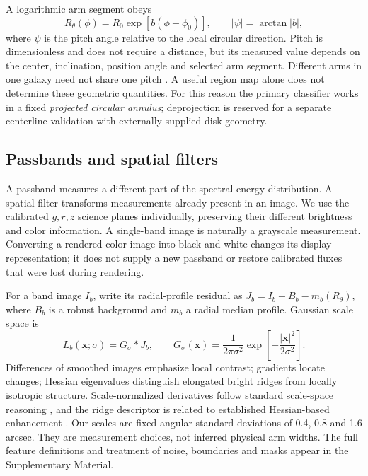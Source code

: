 \documentclass[11pt]{article}
\begin{document}
A logarithmic arm segment obeys
\begin{equation}
 R_\theta(\phi)=R_0\exp[b(\phi-\phi_0)],\qquad
 |\psi|=\arctan |b|,
 \label{eq:pitch}
\end{equation}
where $\psi$ is the pitch angle relative to the local circular direction.
Pitch is dimensionless and does not require a distance, but its measured value
depends on the center, inclination, position angle and selected arm segment.
Different arms in one galaxy need not share one pitch
\citep{davis2014,lingard2021}. A useful region map alone does not determine these
geometric quantities. For this reason the primary classifier works in a fixed
\emph{projected circular annulus}; deprojection is reserved for a separate
centerline validation with externally supplied disk geometry.

\subsection{Passbands and spatial filters}
A passband measures a different part of the spectral energy distribution.
A spatial filter transforms measurements already present in an image. We use
the calibrated $g,r,z$ science planes individually, preserving their different
brightness and color information. A single-band image is naturally a grayscale
measurement. Converting a rendered color image into black and white changes its
display representation; it does not supply a new passband or restore calibrated
fluxes that were lost during rendering.

For a band image $I_b$, write its radial-profile residual as
$J_b=I_b-B_b-m_b(R_\theta)$, where $B_b$ is a robust background and $m_b$ a
radial median profile. Gaussian scale space is
\begin{equation}
 L_b(\bm{x};\sigma)=G_\sigma*J_b,
 \qquad
 G_\sigma(\bm{x})=\frac{1}{2\pi\sigma^2}
 \exp\left[-\frac{|\bm{x}|^2}{2\sigma^2}\right].
 \label{eq:scale}
\end{equation}
Differences of smoothed images emphasize local contrast; gradients locate
changes; Hessian eigenvalues distinguish elongated bright ridges from locally
isotropic structure. Scale-normalized derivatives follow standard scale-space
reasoning \citep{lindeberg1998}, and the ridge descriptor is related to established
Hessian-based enhancement \citep{frangi1998}. Our scales are fixed angular
standard deviations of 0.4, 0.8 and 1.6 arcsec. They are measurement choices,
not inferred physical arm widths. The full feature definitions and treatment
of noise, boundaries and masks appear in the Supplementary Material.
\end{document}
